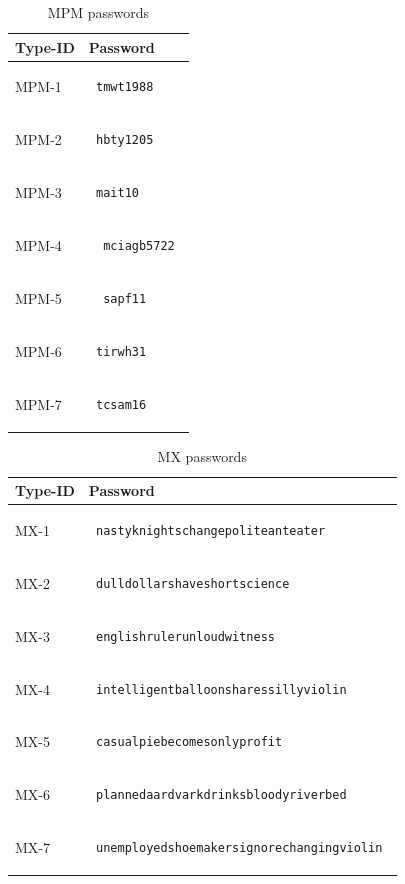 \documentclass{article}
\begin{document}
\begin{table}[h]
\begin{tabular}{|m{1.4cm}|m{8cm}|}
\hline
Type-ID & Password \\
\hline
MPM-1 & \begin{verbatim} tmwt1988  \end{verbatim} \\
\hline
MPM-2 & \begin{verbatim} hbty1205 \end{verbatim} \\
\hline
MPM-3 & \begin{verbatim} mait10  \end{verbatim} \\
\hline
MPM-4 & \begin{verbatim}  mciagb5722 \end{verbatim} \\
\hline
MPM-5 & \begin{verbatim}  sapf11 \end{verbatim} \\
\hline
MPM-6 & \begin{verbatim} tirwh31 \end{verbatim} \\
\hline
MPM-7 & \begin{verbatim} tcsam16 \end{verbatim} \\
\hline
\end{tabular}
\caption{MPM passwords}
\end{table}

\begin{table}[h]
\begin{tabular}{|m{1.4cm}|m{8cm}|}
\hline
Type-ID & Password \\
\hline
MX-1 & \begin{verbatim} nastyknightschangepoliteanteater  \end{verbatim} \\
\hline
MX-2 & \begin{verbatim} dulldollarshaveshortscience \end{verbatim} \\
\hline
MX-3 & \begin{verbatim} englishrulerunloudwitness  \end{verbatim} \\
\hline
MX-4 & \begin{verbatim} intelligentballoonsharessillyviolin  \end{verbatim} \\
\hline
MX-5 & \begin{verbatim} casualpiebecomesonlyprofit \end{verbatim} \\
\hline
MX-6 & \begin{verbatim} plannedaardvarkdrinksbloodyriverbed \end{verbatim} \\
\hline
MX-7 & \begin{verbatim} unemployedshoemakersignorechangingviolin \end{verbatim} \\
\hline
\end{tabular}
\caption{MX passwords}
\end{table}
\end{document}
